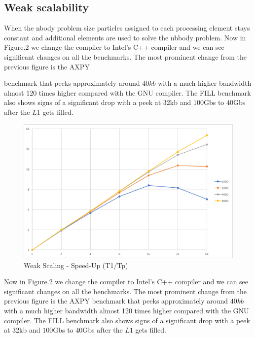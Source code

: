 \documentclass[12pt]{article} %
\begin{document}
\newpage

\subsection{Weak scalability}

When the nbody problem size particles assigned to each processing element stays constant and additional elements are used to solve the nbbody problem. Now in Figure.2 we change the compiler to Intel's C++ compiler and we can see significant changes on all the benchmarks. The most prominent change from the previous figure is the \textsc{AXPY}  

benchmark that peeks approximately around $40kb$ with a much higher bandwidth almost 120 times higher compared with the GNU compiler.  The \textsc{FILL} benchmark also shows signs of a significant drop with a peek at 32kb and $100$Gb\/s to $40$Gb\/s  after the $L1$ gets filled.

\begin{figure}[htb]
\caption{Weak Scaling - Speed-Up (T1/Tp)}\label{fig:benchmark02}
\centering
\includegraphics[width=\textwidth,keepaspectratio]{imgs/img03.png}
\end{figure}

\newpage

Now in Figure.2 we change the compiler to Intel's C++ compiler and we can see significant changes on all the benchmarks. The most prominent change from the previous figure is the \textsc{AXPY}  benchmark that peeks approximately around $40kb$ with a much higher bandwidth almost 120 times higher compared with the GNU compiler.  The \textsc{FILL} benchmark also shows signs of a significant drop with a peek at 32kb and $100$Gb\/s to $40$Gb\/s  after the $L1$ gets filled.
\end{document}
